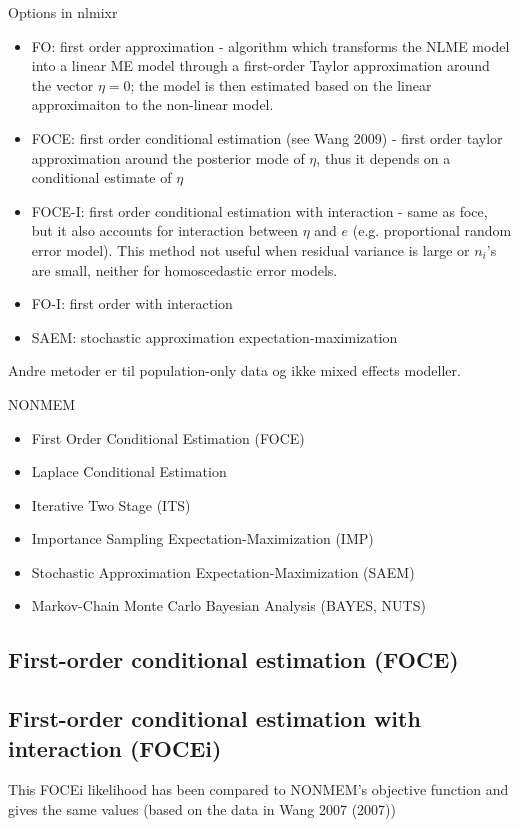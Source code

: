 Options in nlmixr
\begin{itemize}
    \item FO: first order approximation - algorithm which transforms the NLME model into a linear ME model through a first-order Taylor approximation around the vector $\eta =0$; the model is then estimated based on the linear approximaiton to the non-linear model.
    \item FOCE: first order conditional estimation (see Wang 2009) - first order taylor approximation around the posterior mode of $\eta$, thus it depends on a conditional estimate of $\eta$
    \item FOCE-I: first order conditional estimation with interaction - same as foce, but it also accounts for interaction between $\eta$ and $e$ (e.g. proportional random error model). This method not useful when residual variance is large or $n_i$'s are small, neither for homoscedastic error models.

    \item FO-I: first order with interaction

    \item SAEM: stochastic approximation expectation-maximization
\end{itemize}
Andre metoder er til population-only data og ikke mixed effects modeller.


NONMEM 
\begin{itemize}
    \item First Order Conditional Estimation (FOCE)
    \item Laplace Conditional Estimation
    \item Iterative Two Stage (ITS) 
    \item Importance Sampling Expectation-Maximization (IMP)
    \item Stochastic Approximation Expectation-Maximization (SAEM)
    \item Markov-Chain Monte Carlo Bayesian Analysis (BAYES, NUTS) 
\end{itemize}

\subsection{First-order conditional estimation (FOCE)}
\subsection{First-order conditional estimation with interaction (FOCEi)}
This FOCEi likelihood has been compared to NONMEM’s objective function and gives the same values (based on the data in Wang 2007 (2007))
